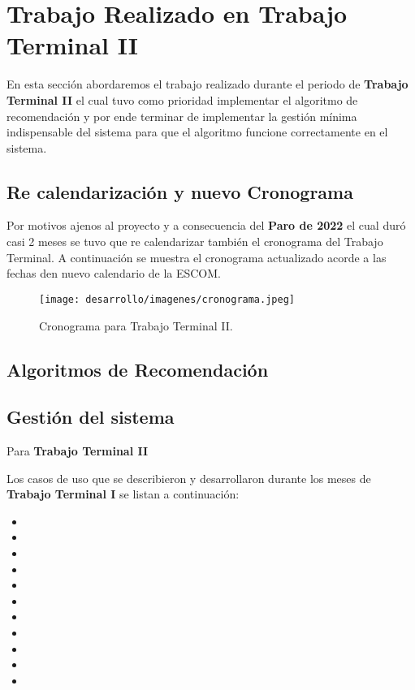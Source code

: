 \section{Trabajo Realizado en Trabajo Terminal II}
En esta sección abordaremos el trabajo realizado durante el periodo de \textbf{Trabajo Terminal II} el cual tuvo como prioridad implementar el algoritmo de recomendación y por ende
terminar de implementar la gestión mínima indispensable del sistema para que el algoritmo funcione correctamente en el sistema.

\subsection{Re calendarización y nuevo Cronograma}
Por motivos ajenos al proyecto y a consecuencia del \textbf{Paro de 2022} el cual duró casi 2 meses se tuvo que re calendarizar también el cronograma del Trabajo Terminal.
A continuación se muestra el cronograma actualizado acorde a las fechas den nuevo calendario de la ESCOM.
\begin{figure}[H]
    \begin{center}
        \texttt{[image: desarrollo/imagenes/cronograma.jpeg]}
    \end{center}
    \caption{Cronograma para Trabajo Terminal II.}
    \label{mark:top}
\end{figure}


\subsection{Algoritmos de Recomendación}

\subsection{Gestión del sistema}
Para \textbf{Trabajo Terminal II}

Los casos de uso que se describieron y desarrollaron durante los meses de \textbf{Trabajo Terminal I} se listan a continuación:
    \begin{itemize}
        \item {}
        \item {}
        \item {}
        \item {}
        \item {}
        \item {}
        \item {}
        \item {} 
        \item {} 
        \item {}
        \item {}
    \end{itemize} 